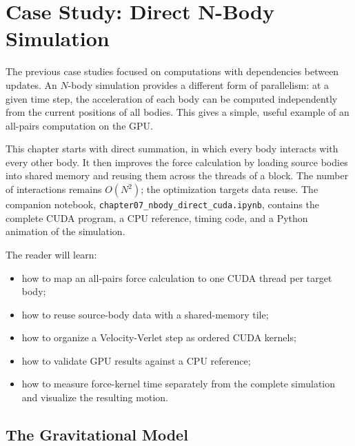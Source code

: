\chapter{Case Study: Direct N-Body Simulation}
\label{ch:cuda-nbody}

The previous case studies focused on computations with dependencies between
updates. An $N$-body simulation provides a different form of parallelism: at a
given time step, the acceleration of each body can be computed independently
from the current positions of all bodies. This gives a simple, useful example
of an all-pairs computation on the GPU.

This chapter starts with direct summation, in which every body interacts with
every other body. It then improves the force calculation by loading source
bodies into shared memory and reusing them across the threads of a block. The
number of interactions remains $O(N^2)$; the optimization targets data reuse.
The companion notebook, \lstinline|chapter07_nbody_direct_cuda.ipynb|,
contains the complete CUDA program, a CPU reference, timing code, and a Python
animation of the simulation.

\begin{learningbox}
The reader will learn:
\begin{itemize}
    \item how to map an all-pairs force calculation to one CUDA thread per
          target body;
    \item how to reuse source-body data with a shared-memory tile;
    \item how to organize a Velocity-Verlet step as ordered CUDA kernels;
    \item how to validate GPU results against a CPU reference;
    \item how to measure force-kernel time separately from the complete
          simulation and visualize the resulting motion.
\end{itemize}
\end{learningbox}

\section{The Gravitational Model}
\label{sec:nbody-model}

